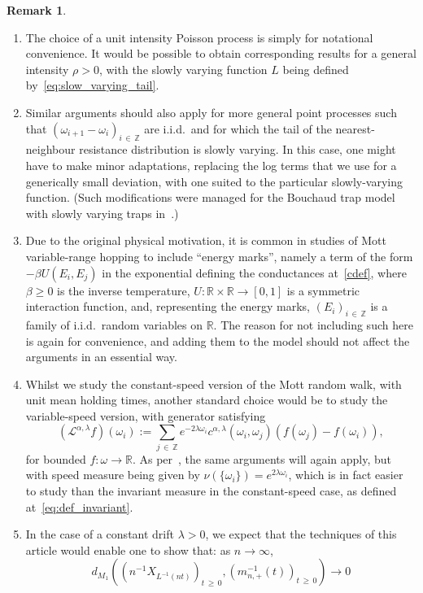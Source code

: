 \documentclass[10pt]{amsart}
\theoremstyle{definition}\newtheorem{defi}[theo]{Definition}\newtheorem{rema}[theo]{Remark}\newtheorem{exam}[theo]{Example}\newtheorem{exem}[theo]{Example}\newtheorem{nota}[theo]{Notation}
\newcommand{\Z}{\mathbb Z}
\newcommand{\R}{\mathbb R}
\newcommand{\clL}{\mathcal{L}}
\newcommand*{\alphenumi}{\renewcommand*{\theenumi}{\alph{enumi}}}
\begin{document}
\begin{rema}\leavevmode
\begin{enumerate}\alphenumi
\item The choice of a unit intensity Poisson process is simply for notational convenience. It would be possible to obtain corresponding results for a general intensity $\rho>0$, with the slowly varying function $L$ being defined by~\eqref{eq:slow_varying_tail}.
\item Similar arguments should also apply for more general point processes such that $(\omega_{i+1}-\omega_i)_{i\,\in\,\Z}$ are i.i.d.\ and for which the tail of the nearest-neighbour resistance distribution is slowly varying. In this case, one might have to make minor adaptations, replacing the log terms that we use for a generically small deviation, with one suited to the particular slowly-varying function. (Such modifications were managed for the Bouchaud trap model with slowly varying traps in~\cite{CM1}.)
\item Due to the original physical motivation, it is common in studies of Mott variable-range hopping to include ``energy marks'', namely a term of the form $-\beta U(E_i,E_j)$ in the exponential defining the conductances at~\eqref{cdef}, where $\beta\geq 0$ is the inverse temperature, $U\colon \R\times\R\to[0,1]$ is a symmetric interaction function, and, representing the energy marks, $(E_i)_{i\,\in\,\Z}$ is a family of i.i.d.\ random variables on $\R$. The reason for not including such here is again for convenience, and adding them to the model should not affect the arguments in an essential way.
\item Whilst we study the constant-speed version of the Mott random walk, with unit mean holding times, another standard choice would be to study the variable-speed version, with generator satisfying
\[
\left(\clL^{\alpha,\lambda}f\right)(\omega_i):=\sum_{j\,\in\,\Z}e^{-2\lambda\omega_i}c^{\alpha,\lambda}\left(\omega_i,\omega_j\right)\left(f(\omega_j)-f(\omega_i)\right),
\]
for bounded $f:\omega\rightarrow\R$. As per~\cite[Remarks 1.3 and 3.2]{CFJ}, the same arguments will again apply, but with speed measure being given by $\nu(\{\omega_i\})=e^{2\lambda\omega_i}$, which is in fact easier to study than the invariant measure in the constant-speed case, as defined at~\eqref{eq:def_invariant}.
\item In the case of a constant drift $\lambda>0$, we expect that the techniques of this article would enable one to show that: as $n\rightarrow\infty$,
\[
d_{M_1}\left(\left(n^{-1}{X}_{L^{-1}(n t)}\right)_{t\,\geq\,0},\left(m_{n,+}^{-1}(t)\right)_{t\,\geq\,0}\right)\rightarrow 0
\]
\end{enumerate}
\end{rema}
\end{document}
